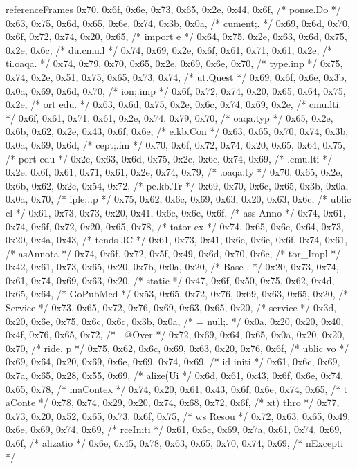 \begin{chunk}{referenceFrames}
{0x70, 0x6f, 0x6e, 0x73, 0x65, 0x2e, 0x44, 0x6f, /* ponse.Do */
0x63, 0x75, 0x6d, 0x65, 0x6e, 0x74, 0x3b, 0x0a, /* cument;. */
0x69, 0x6d, 0x70, 0x6f, 0x72, 0x74, 0x20, 0x65, /* import e */
0x64, 0x75, 0x2e, 0x63, 0x6d, 0x75, 0x2e, 0x6c, /* du.cmu.l */
0x74, 0x69, 0x2e, 0x6f, 0x61, 0x71, 0x61, 0x2e, /* ti.oaqa. */
0x74, 0x79, 0x70, 0x65, 0x2e, 0x69, 0x6e, 0x70, /* type.inp */
0x75, 0x74, 0x2e, 0x51, 0x75, 0x65, 0x73, 0x74, /* ut.Quest */
0x69, 0x6f, 0x6e, 0x3b, 0x0a, 0x69, 0x6d, 0x70, /* ion;.imp */
0x6f, 0x72, 0x74, 0x20, 0x65, 0x64, 0x75, 0x2e, /* ort edu. */
0x63, 0x6d, 0x75, 0x2e, 0x6c, 0x74, 0x69, 0x2e, /* cmu.lti. */
0x6f, 0x61, 0x71, 0x61, 0x2e, 0x74, 0x79, 0x70, /* oaqa.typ */
0x65, 0x2e, 0x6b, 0x62, 0x2e, 0x43, 0x6f, 0x6e, /* e.kb.Con */
0x63, 0x65, 0x70, 0x74, 0x3b, 0x0a, 0x69, 0x6d, /* cept;.im */
0x70, 0x6f, 0x72, 0x74, 0x20, 0x65, 0x64, 0x75, /* port edu */
0x2e, 0x63, 0x6d, 0x75, 0x2e, 0x6c, 0x74, 0x69, /* .cmu.lti */
0x2e, 0x6f, 0x61, 0x71, 0x61, 0x2e, 0x74, 0x79, /* .oaqa.ty */
0x70, 0x65, 0x2e, 0x6b, 0x62, 0x2e, 0x54, 0x72, /* pe.kb.Tr */
0x69, 0x70, 0x6c, 0x65, 0x3b, 0x0a, 0x0a, 0x70, /* iple;..p */
0x75, 0x62, 0x6c, 0x69, 0x63, 0x20, 0x63, 0x6c, /* ublic cl */
0x61, 0x73, 0x73, 0x20, 0x41, 0x6e, 0x6e, 0x6f, /* ass Anno */
0x74, 0x61, 0x74, 0x6f, 0x72, 0x20, 0x65, 0x78, /* tator ex */
0x74, 0x65, 0x6e, 0x64, 0x73, 0x20, 0x4a, 0x43, /* tends JC */
0x61, 0x73, 0x41, 0x6e, 0x6e, 0x6f, 0x74, 0x61, /* asAnnota */
0x74, 0x6f, 0x72, 0x5f, 0x49, 0x6d, 0x70, 0x6c, /* tor_Impl */
0x42, 0x61, 0x73, 0x65, 0x20, 0x7b, 0x0a, 0x20, /* Base {.  */
0x20, 0x73, 0x74, 0x61, 0x74, 0x69, 0x63, 0x20, /*  static  */
0x47, 0x6f, 0x50, 0x75, 0x62, 0x4d, 0x65, 0x64, /* GoPubMed */
0x53, 0x65, 0x72, 0x76, 0x69, 0x63, 0x65, 0x20, /* Service  */
0x73, 0x65, 0x72, 0x76, 0x69, 0x63, 0x65, 0x20, /* service  */
0x3d, 0x20, 0x6e, 0x75, 0x6c, 0x6c, 0x3b, 0x0a, /* = null;. */
0x0a, 0x20, 0x20, 0x40, 0x4f, 0x76, 0x65, 0x72, /* .  @Over */
0x72, 0x69, 0x64, 0x65, 0x0a, 0x20, 0x20, 0x70, /* ride.  p */
0x75, 0x62, 0x6c, 0x69, 0x63, 0x20, 0x76, 0x6f, /* ublic vo */
0x69, 0x64, 0x20, 0x69, 0x6e, 0x69, 0x74, 0x69, /* id initi */
0x61, 0x6c, 0x69, 0x7a, 0x65, 0x28, 0x55, 0x69, /* alize(Ui */
0x6d, 0x61, 0x43, 0x6f, 0x6e, 0x74, 0x65, 0x78, /* maContex */
0x74, 0x20, 0x61, 0x43, 0x6f, 0x6e, 0x74, 0x65, /* t aConte */
0x78, 0x74, 0x29, 0x20, 0x74, 0x68, 0x72, 0x6f, /* xt) thro */
0x77, 0x73, 0x20, 0x52, 0x65, 0x73, 0x6f, 0x75, /* ws Resou */
0x72, 0x63, 0x65, 0x49, 0x6e, 0x69, 0x74, 0x69, /* rceIniti */
0x61, 0x6c, 0x69, 0x7a, 0x61, 0x74, 0x69, 0x6f, /* alizatio */
0x6e, 0x45, 0x78, 0x63, 0x65, 0x70, 0x74, 0x69, /* nExcepti */
}}
\end{chunk}
